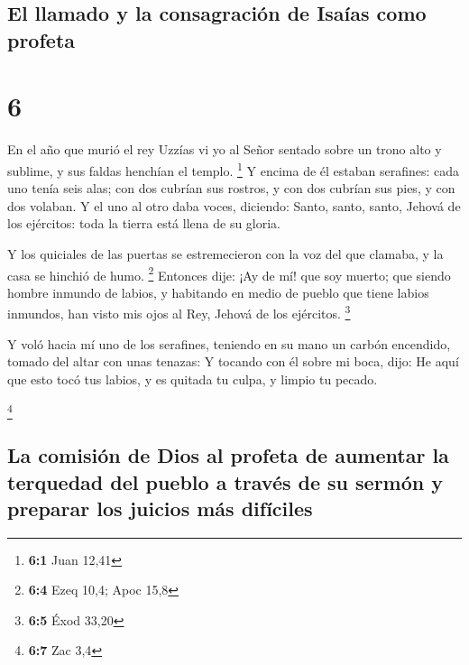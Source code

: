 \hypertarget{el-llamado-y-la-consagraciuxf3n-de-isauxedas-como-profeta}{%
\subsection{El llamado y la consagración de Isaías como
profeta}\label{el-llamado-y-la-consagraciuxf3n-de-isauxedas-como-profeta}}

\hypertarget{section-5}{%
\section{6}\label{section-5}}

 En el año que murió el rey Uzzías vi yo al Señor sentado
sobre un trono alto y sublime, y sus faldas henchían el templo.
\footnote{\textbf{6:1} Juan 12,41}  Y encima de él estaban
serafines: cada uno tenía seis alas; con dos cubrían sus rostros, y con
dos cubrían sus pies, y con dos volaban.  Y el uno al otro
daba voces, diciendo: Santo, santo, santo, Jehová de los ejércitos: toda
la tierra está llena de su gloria.

 Y los quiciales de las puertas se estremecieron con la
voz del que clamaba, y la casa se hinchió de humo. \footnote{\textbf{6:4}
  Ezeq 10,4; Apoc 15,8}  Entonces dije: ¡Ay de mí! que soy
muerto; que siendo hombre inmundo de labios, y habitando en medio de
pueblo que tiene labios inmundos, han visto mis ojos al Rey, Jehová de
los ejércitos. \footnote{\textbf{6:5} Éxod 33,20}

 Y voló hacia mí uno de los serafines, teniendo en su mano
un carbón encendido, tomado del altar con unas tenazas:  Y
tocando con él sobre mi boca, dijo: He aquí que esto tocó tus labios, y
es quitada tu culpa, y limpio tu pecado.

\footnote{\textbf{6:7} Zac 3,4}

\hypertarget{la-comisiuxf3n-de-dios-al-profeta-de-aumentar-la-terquedad-del-pueblo-a-travuxe9s-de-su-sermuxf3n-y-preparar-los-juicios-muxe1s-difuxedciles}{%
\subsection{La comisión de Dios al profeta de aumentar la terquedad del
pueblo a través de su sermón y preparar los juicios más
difíciles}\label{la-comisiuxf3n-de-dios-al-profeta-de-aumentar-la-terquedad-del-pueblo-a-travuxe9s-de-su-sermuxf3n-y-preparar-los-juicios-muxe1s-difuxedciles}}

